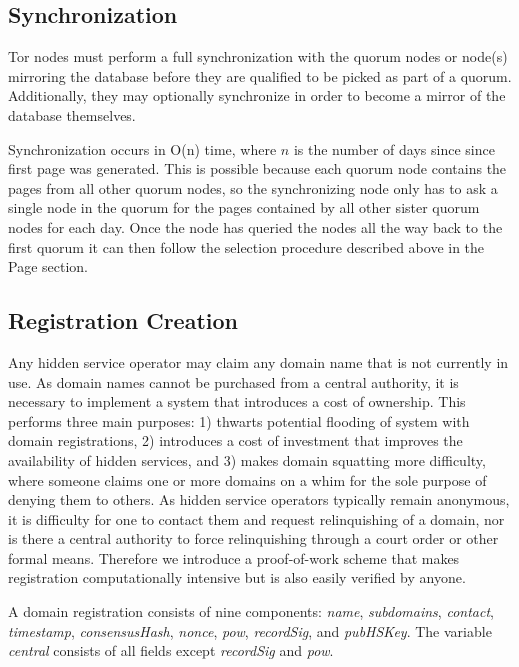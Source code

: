 \subsection{Synchronization}

Tor nodes must perform a full synchronization with the quorum nodes or node(s) mirroring the database before they are qualified to be picked as part of a quorum. Additionally, they may optionally synchronize in order to become a mirror of the database themselves.

Synchronization occurs in O(n) time, where $ n $ is the number of days since since first page was generated. This is possible because each quorum node contains the pages from all other quorum nodes, so the synchronizing node only has to ask a single node in the quorum for the pages contained by all other sister quorum nodes for each day. Once the node has queried the nodes all the way back to the first quorum it can then follow the selection procedure described above in the Page section.

\subsection{Registration Creation}

Any hidden service operator may claim any domain name that is not currently in use. As domain names cannot be purchased from a central authority, it is necessary to implement a system that introduces a cost of ownership. This performs three main purposes: 1) thwarts potential flooding of system with domain registrations, 2) introduces a cost of investment that improves the availability of hidden services, and 3) makes domain squatting more difficulty, where someone claims one or more domains on a whim for the sole purpose of denying them to others. As hidden service operators typically remain anonymous, it is difficulty for one to contact them and request relinquishing of a domain, nor is there a central authority to force relinquishing through a court order or other formal means. Therefore we introduce a proof-of-work scheme that makes registration computationally intensive but is also easily verified by anyone.

A domain registration consists of nine components: \emph{name}, \emph{subdomains}, \emph{contact}, \emph{timestamp}, \emph{consensusHash}, \emph{nonce}, \emph{pow}, \emph{recordSig}, and \emph{pubHSKey}. The variable \emph{central} consists of all fields except \emph{recordSig} and \emph{pow}.

